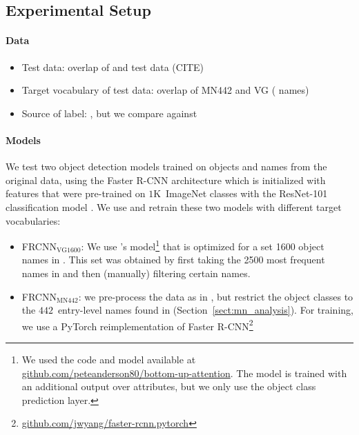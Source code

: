 \subsection{Experimental Setup}
\label{sect:exp_setup}

\paragraph{Data}
\begin{itemize}
	\item Test data: overlap of \mn and \vg test data (CITE)
	\item Target vocabulary of test data: overlap of MN442 and VG ( names)
	\item Source of label: \mn, but we compare against \vg
\end{itemize}

\paragraph{Models}

We test two object detection models trained on objects and names from the original \vg data, using the Faster R-CNN architecture \cite{fasterrcnn2015} which is initialized with features that were pre-trained on $1$K~ImageNet classes with the ResNet-101 classification model \cite{he2016deep}.
We use and retrain these two models with different target vocabularies:

\begin{small}
\begin{itemize}
\item FRCNN$_{\text{VG1600}}$: We use \citep{anderson2018updown}'s model\footnote{We used the code and model available at  \url{github.com/peteanderson80/bottom-up-attention}. The model is trained with an additional output over attributes, but we only use the object class prediction layer.} that is optimized for a set 1600 object names in \vg. This set was obtained by first taking the 2500 most frequent names in \vg and then (manually) filtering certain names.
 \item  FRCNN$_{\text{MN442}}$: we pre-process the \vg data as in \citeauthor{anderson2018updown}, but restrict the object classes to the $442$~entry-level names found in \mn (Section~\ref{sect:mn_analysis}). 
For training, we use a PyTorch reimplementation of Faster R-CNN\footnote{\url{github.com/jwyang/faster-rcnn.pytorch}}
\end{itemize}
\end{small}

